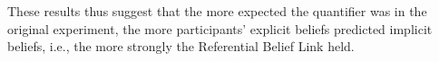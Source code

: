 \documentclass[10pt,letterpaper]{article}
\newcommand{\figref}[1]{Fig.~\ref{#1}}
\newcommand{\jd}[1]{\textcolor{Pink}{[jd: #1]}}
\begin{document}
These results thus suggest that the more expected the quantifier was in the original experiment, the more participants' explicit beliefs predicted implicit beliefs, i.e., the more strongly the Referential Belief Link held.




\end{document}
